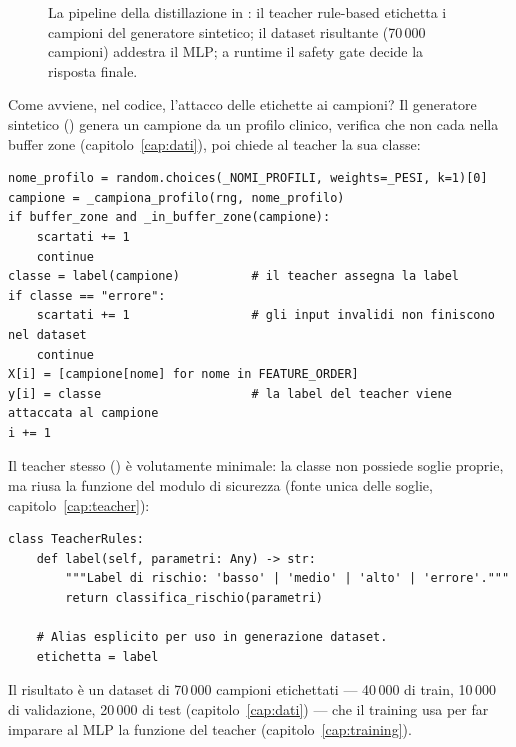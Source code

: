 \begin{figure}[htbp]
  \centering
  
  \caption{La pipeline della distillazione in \progetto{}: il teacher
  rule-based etichetta i campioni del generatore sintetico; il dataset
  risultante (70\,000 campioni) addestra il MLP; a runtime il safety gate
  decide la risposta finale.}
  \label{fig:diagramma-distillazione}
\end{figure}

Come avviene, nel codice, l'attacco delle etichette ai campioni? Il
generatore sintetico () genera un
campione da un profilo clinico, verifica che non cada nella buffer zone
(capitolo~\ref{cap:dati}), poi chiede al teacher la sua classe:

\begin{lstlisting}[caption={Come il teacher etichetta ogni campione in \file{synthetic\_generator.py} (ciclo di \codice{genera\_batch}).}]
nome_profilo = random.choices(_NOMI_PROFILI, weights=_PESI, k=1)[0]
campione = _campiona_profilo(rng, nome_profilo)
if buffer_zone and _in_buffer_zone(campione):
    scartati += 1
    continue
classe = label(campione)          # il teacher assegna la label
if classe == "errore":
    scartati += 1                 # gli input invalidi non finiscono nel dataset
    continue
X[i] = [campione[nome] for nome in FEATURE_ORDER]
y[i] = classe                     # la label del teacher viene attaccata al campione
i += 1
\end{lstlisting}

Il teacher stesso () è volutamente
minimale: la classe  non possiede soglie proprie, ma
riusa la funzione  del modulo di sicurezza
(fonte unica delle soglie, capitolo~\ref{cap:teacher}):

\begin{lstlisting}[caption={Il teacher \codice{TeacherRules} in \file{teacher\_rules.py}: nessuna soglia propria, solo riuso della fonte unica.}]
class TeacherRules:
    def label(self, parametri: Any) -> str:
        """Label di rischio: 'basso' | 'medio' | 'alto' | 'errore'."""
        return classifica_rischio(parametri)

    # Alias esplicito per uso in generazione dataset.
    etichetta = label
\end{lstlisting}

Il risultato è un dataset di 70\,000 campioni etichettati — 40\,000 di
train, 10\,000 di validazione, 20\,000 di test (capitolo~\ref{cap:dati}) —
che il training usa per far imparare al MLP la funzione del teacher
(capitolo~\ref{cap:training}).

